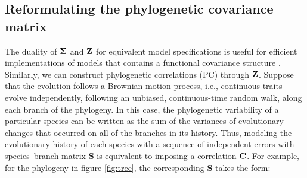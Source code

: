 \documentclass[12pt]{article}
\begin{document}



\subsection*{Reformulating the phylogenetic covariance matrix}


\newcommand{\bS}{{\mathbf S}}
\newcommand{\bJ}{{\mathbf J}}
\newcommand{\bB}{{\mathbf B}}
\newcommand{\bBadj}{{\mathbf B}_{\mbox{\tiny adj}}}
\newcommand{\bomega}{{\boldsymbol \omega}}
\newcommand{\bell}{{\boldsymbol \ell}}
\newcommand{\e}{{ \epsilon}}

The duality of ${\boldsymbol \Sigma}$ and ${\mathbf Z}$ for equivalent model specifications is useful for efficient implementations of models that contains a functional covariance structure \citep{hefley2017basis}. 
Similarly, we can construct phylogenetic correlations (PC) through ${\mathbf Z}$.
Suppose that the evolution follows a Brownian-motion process, i.e., continuous traits evolve independently, following an unbiased, continuous-time random walk, along each branch of the phylogeny.
In this case, the phylogenetic variability of a particular species can be written as the sum of the variances of evolutionary changes that occurred on all of the branches in its history. 
Thus, modeling the evolutionary history of each species with a sequence of independent errors with species--branch matrix $\bS$ is equivalent to imposing a correlation ${\mathbf C}$.
For example, for the phylogeny in figure \ref{fig:tree}, the corresponding $\bS$ takes the form:
\end{document}
